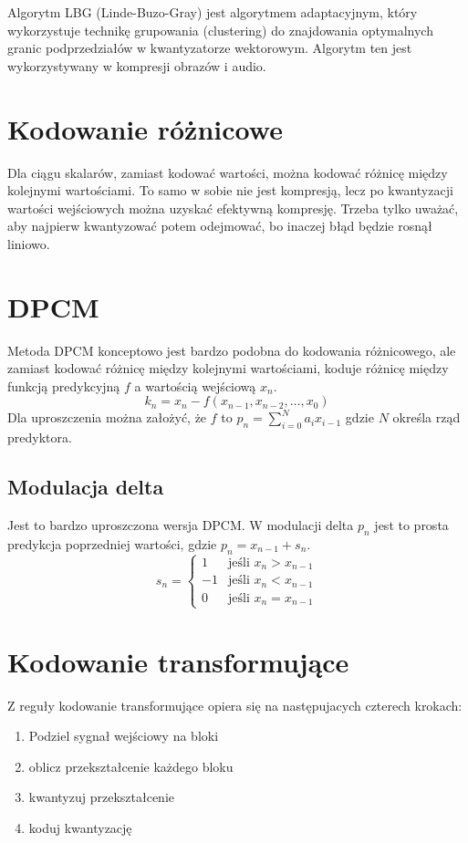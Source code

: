 \documentclass{../konspekt}
\begin{document}
\begin{multicols}{2}
  Algorytm LBG (Linde-Buzo-Gray) jest algorytmem adaptacyjnym, który
  wykorzystuje
  technikę grupowania (clustering) do znajdowania optymalnych granic
  podprzedziałów
  w kwantyzatorze wektorowym. Algorytm ten jest wykorzystywany w
  kompresji obrazów
  i audio.

  \section*{Kodowanie różnicowe}

  Dla ciągu skalarów, zamiast kodować wartości, można kodować różnicę między
  kolejnymi wartościami. To samo w sobie nie jest kompresją, lecz po kwantyzacji
  wartości wejściowych można uzyskać efektywną kompresję. Trzeba tylko uważać,
  aby najpierw kwantyzować potem odejmować, bo inaczej błąd będzie
  rosnął liniowo.

  \section*{DPCM}

  Metoda DPCM konceptowo jest bardzo podobna do kodowania
  różnicowego, ale zamiast
  kodować różnicę między kolejnymi wartościami, koduje różnicę między funkcją
  predykcyjną $f$ a wartością wejściową $x_n$.
  $$
  k_n = x_n -f(x_{n-1}, x_{n-2}, \dots, x_{0})
  $$
  Dla uproszczenia można założyć, że $f$ to $p_n = \sum_{i=0}^{N} a_i x_{i - 1}$
  gdzie $N$ określa rząd predyktora.

  \subsection*{Modulacja delta}

  Jest to bardzo uproszczona wersja DPCM. W modulacji delta $p_n$ jest to
  prosta predykcja poprzedniej wartości, gdzie $p_n = x_{n-1} + s_n$.
  $$
  s_n =
  \begin{cases}
    1 & \text{jeśli } x_n > x_{n-1} \\
    -1 & \text{jeśli } x_n < x_{n-1} \\
    0 & \text{jeśli } x_n = x_{n-1}
  \end{cases}
  $$

  \section*{Kodowanie transformujące}

  Z reguły kodowanie transformujące opiera się na następujacych
  czterech krokach:
  \begin{enumerate}
    \item Podziel sygnał wejściowy na bloki
    \item oblicz przekształcenie każdego bloku
    \item kwantyzuj przekształcenie
    \item koduj kwantyzację
  \end{enumerate}


\end{multicols}
\end{document}
